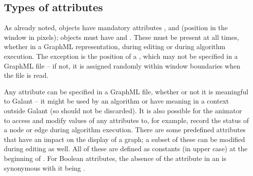 \subsection{Types of attributes}

As already noted,  objects have mandatory attributes ,
 and  (position in the window in pixels); 
objects must have  and .
These must be present at all times, whether in a GraphML representation,
during editing or during algorithm execution.
The exception is the position of a , which may not be specified in
a GraphML file -- if not, it is assigned randomly within window boundaries
when the file is read.

Any attribute can be specified in a GraphML file, whether or not it is
meaningful to Galant -- it might be used by an algorithm or have meaning in a
context outside Galant (so should not be discarded).
It is also possible for the animator to access and modify values of any
attributes to, for example, record the status of a node or edge during
algorithm execution. There are some predefined attributes that have an impact
on the display of a graph; a subset of these can be modified during editing
as well. All of these are defined as constants (in upper case)
at the beginning of
. For Boolean attributes, the absence of the attribute in
an  is synonymous with it being .

